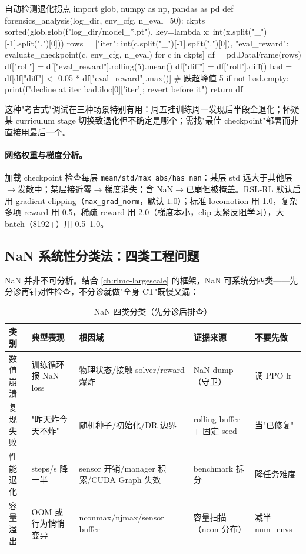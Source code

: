 \begin{codebox}[Python]{自动检测退化拐点}
import glob, numpy as np, pandas as pd
def forensics_analysis(log_dir, env_cfg, n_eval=50):
    ckpts = sorted(glob.glob(f"{log_dir}/model_*.pt"),
                   key=lambda x: int(x.split("_")[-1].split(".")[0]))
    rows = [{"iter": int(c.split("_")[-1].split(".")[0]),
             "eval_reward": evaluate_checkpoint(c, env_cfg, n_eval)} for c in ckpts]
    df = pd.DataFrame(rows)
    df["roll"] = df["eval_reward"].rolling(5).mean()
    df["diff"] = df["roll"].diff()
    bad = df[df["diff"] < -0.05 * df["eval_reward"].max()]   # 跌超峰值 5%
    if not bad.empty:
        print(f"decline at iter {bad.iloc[0]['iter']}; revert before it")
    return df
\end{codebox}

这种"考古式"调试在三种场景特别有用：周五挂训练周一发现后半段全退化；怀疑某 curriculum stage 切换致退化但不确定是哪个；需找"最佳 checkpoint"部署而非直接用最后一个。

\paragraph{网络权重与梯度分析。}加载 checkpoint 检查每层 \verb|mean/std/max_abs/has_nan|：某层 std 远大于其他层$\to$发散中；某层接近零$\to$梯度消失；含 NaN$\to$已崩但被掩盖。RSL-RL 默认启用 gradient clipping（\verb|max_grad_norm|，默认 $1.0$）；标准 locomotion 用 1.0，复杂多项 reward 用 0.5，稀疏 reward 用 2.0（梯度本小，clip 太紧反阻学习），大 batch（8192+）用 0.5--1.0。

\subsection{NaN 系统性分类法：四类工程问题}

NaN 并非不可分析。结合 \cref{ch:rlmc-largescale} 的框架，NaN 可系统分四类——先分诊再针对性检查，不分诊就做"全身 CT"既慢又漏：

\begin{table}[H]
\centering
\caption{NaN 四类分类（先分诊后排查）}
\label{tab:rlmc-diag-nan4}
\begin{tabular}{p{2.0cm}p{2.8cm}p{3.0cm}p{2.4cm}p{2.4cm}}
\hline
类别 & 典型表现 & 根因域 & 证据来源 & 不要先做 \\
\hline
数值崩溃 & 训练循环报 NaN loss & 物理状态/接触 solver/reward 爆炸 & NaN dump（守卫） & 调 PPO lr \\
复现失败 & "昨天炸今天不炸" & 随机种子/初始化/DR 边界 & rolling buffer + 固定 seed & 当"已修复" \\
性能退化 & steps/s 降一半 & sensor 开销/manager 积累/CUDA Graph 失效 & benchmark 拆分 & 降任务难度 \\
容量溢出 & OOM 或行为悄悄变异 & nconmax/njmax/sensor buffer & 容量扫描（ncon 分布） & 减半 num\_envs \\
\hline
\end{tabular}
\end{table}

